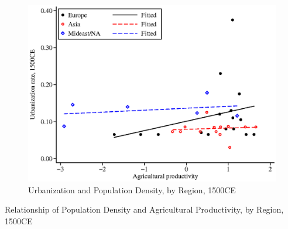 \documentclass[10pt]{article}
\begin{document}
\begin{figure}[htbp]
\begin{center}
\caption{Urbanization and Population Density, by Region, 1500CE}
\label{FIG_ag_urban}
\includegraphics[width=1.0\textwidth]{fig_ag_urban.eps}
\end{center}
\end{figure}


\begin{table}[htb]
\begin{center}
\caption{Relationship of Population Density and Agricultural Productivity, by Region, 1500CE}
\label{TAB_ag_regions}

\end{center}
\end{table}
\end{document}
